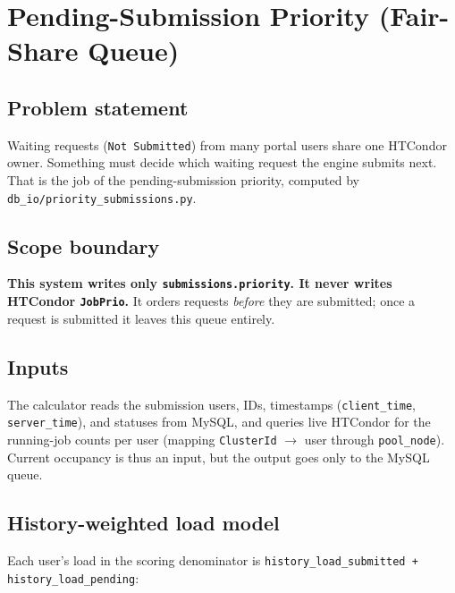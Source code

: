 \section{Pending-Submission Priority (Fair-Share Queue)}\label{ch:10}

\subsection{Problem statement}

Waiting requests (\texttt{Not Submitted}) from many portal users share one HTCondor owner. Something must
decide which waiting request the engine submits next. That is the job of the pending-submission priority,
computed by \texttt{db\_\allowbreak{}io/\allowbreak{}priority\_\allowbreak{}submissions.\allowbreak{}py}.

\subsection{Scope boundary}

\textbf{This system writes only \texttt{submissions.\allowbreak{}priority}. It never writes HTCondor
\texttt{JobPrio}.} It orders requests \textit{before} they are submitted; once a request is submitted it leaves
this queue entirely.

\subsection{Inputs}

The calculator reads the submission users, IDs, timestamps (\texttt{client\_\allowbreak{}time},
\texttt{server\_\allowbreak{}time}), and statuses from MySQL, and queries live HTCondor for the running-job
counts per user (mapping \texttt{ClusterId} $\rightarrow$ user through \texttt{pool\_\allowbreak{}node}).
Current occupancy is thus an input, but the output goes only to the MySQL queue.

\subsection{History-weighted load model}

Each user's load in the scoring denominator is \texttt{history\_\allowbreak{}load\_\allowbreak{}submitted +
history\_\allowbreak{}load\_\allowbreak{}pending}:

